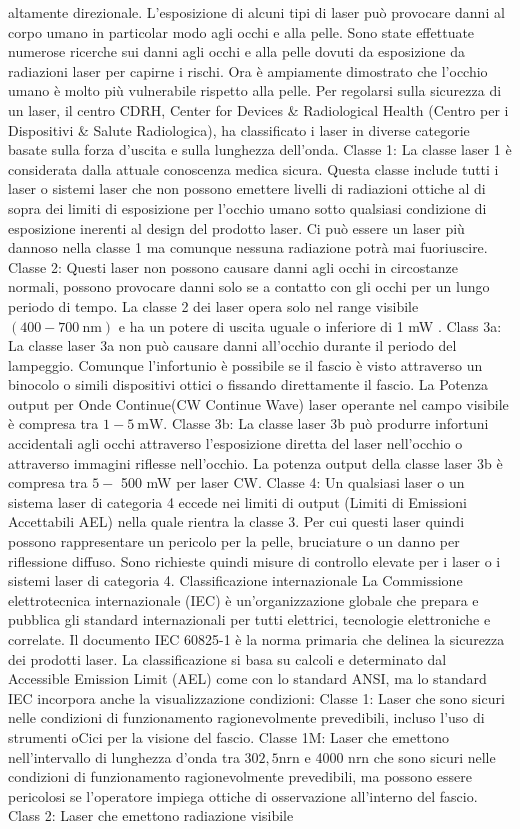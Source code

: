 \documentclass[10pt]{article}
\begin{document}
altamente direzionale. L'esposizione di alcuni tipi di laser può provocare danni al corpo umano in particolar modo agli occhi e alla pelle. Sono state effettuate numerose ricerche sui danni agli occhi e alla pelle dovuti da esposizione da radiazioni laser per capirne i rischi. Ora è ampiamente dimostrato che l'occhio umano è molto più vulnerabile rispetto alla pelle. Per regolarsi sulla sicurezza di un laser, il centro CDRH, Center for Devices \& Radiological Health (Centro per i Dispositivi \& Salute Radiologica), ha classificato i laser in diverse categorie basate sulla forza d'uscita e sulla lunghezza dell'onda. Classe 1: La classe laser 1 è considerata dalla attuale conoscenza medica sicura. Questa classe include tutti i laser o sistemi laser che non possono emettere livelli di radiazioni ottiche al di sopra dei limiti di esposizione per l’occhio umano sotto qualsiasi condizione di esposizione inerenti al design del prodotto laser. Ci può essere un laser più dannoso nella classe 1 ma comunque nessuna radiazione potrà mai fuoriuscire. Classe 2: Questi laser non possono causare danni agli occhi in circostanze normali, possono provocare danni solo se a contatto con gli occhi per un lungo periodo di tempo. La classe 2 dei laser opera solo nel range visibile $(400-700 \mathrm{~nm})$ e ha un potere di uscita uguale o inferiore di 1 mW . Class 3a: La classe laser 3a non può causare danni all'occhio durante il periodo del lampeggio. Comunque l'infortunio è possibile se il fascio è visto attraverso un binocolo o simili dispositivi ottici o fissando direttamente il fascio. La Potenza output per Onde Continue(CW Continue Wave) laser operante nel campo visibile è compresa tra $1-5 \mathrm{~mW}$. Classe 3b: La classe laser 3b può produrre infortuni accidentali agli occhi attraverso l'esposizione diretta del laser nell'occhio o attraverso immagini riflesse nell'occhio. La potenza output della classe laser 3b è compresa tra $5-$ 500 mW per laser CW. Classe 4: Un qualsiasi laser o un sistema laser di categoria 4 eccede nei limiti di output (Limiti di Emissioni Accettabili AEL) nella quale rientra la classe 3. Per cui questi laser quindi possono rappresentare un pericolo per la pelle, bruciature o un danno per riflessione diffuso. Sono richieste quindi misure di controllo elevate per i laser o i sistemi laser di categoria 4. Classificazione internazionale La Commissione elettrotecnica internazionale (IEC) è un'organizzazione globale che prepara e pubblica gli standard internazionali per tutti elettrici, tecnologie elettroniche e correlate. Il documento IEC 60825-1 è la norma primaria che delinea la sicurezza dei prodotti laser. La classificazione si basa su calcoli e determinato dal Accessible Emission Limit (AEL) come con lo standard ANSI, ma lo standard IEC incorpora anche la visualizzazione condizioni: Classe 1: Laser che sono sicuri nelle condizioni di funzionamento ragionevolmente prevedibili, incluso l'uso di strumenti oCici per la visione del fascio. Classe 1M: Laser che emettono nell'intervallo di lunghezza d'onda tra $302,5 \mathrm{nrn}$ e 4000 nrn che sono sicuri nelle condizioni di funzionamento ragionevolmente prevedibili, ma possono essere pericolosi se l'operatore impiega ottiche di osservazione all'interno del fascio. Class 2: Laser che emettono radiazione visibile 
\end{document}
